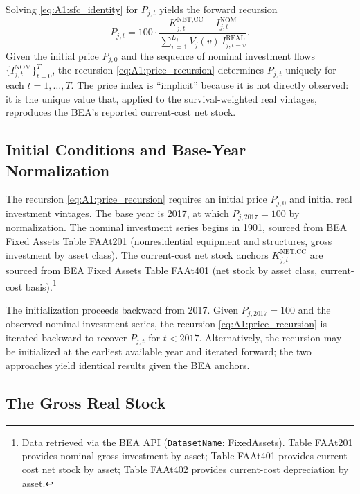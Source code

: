 Solving \eqref{eq:A1:sfc_identity} for $P_{j,t}$ yields the
forward recursion
\begin{equation}
	P_{j,t} = 100 \cdot
	\frac{K^{\text{NET,CC}}_{j,t} - I^{\text{NOM}}_{j,t}}
	{\displaystyle\sum_{v=1}^{L_j} V_j(v)\,
		I^{\text{REAL}}_{j,t-v}}.
	\label{eq:A1:price_recursion}
\end{equation}
Given the initial price $P_{j,0}$ and the sequence of nominal
investment flows $\{I^{\text{NOM}}_{j,t}\}_{t=0}^{T}$, the
recursion \eqref{eq:A1:price_recursion} determines $P_{j,t}$
uniquely for each $t = 1, \ldots, T$. The price index is
``implicit'' because it is not directly observed: it is the unique
value that, applied to the survival-weighted real vintages,
reproduces the BEA's reported current-cost net stock.

\subsection{Initial Conditions and Base-Year Normalization}
\label{app:A1:initialization}

The recursion \eqref{eq:A1:price_recursion} requires an initial
price $P_{j,0}$ and initial real investment vintages. The base
year is 2017, at which $P_{j,2017} = 100$ by normalization. The
nominal investment series begins in 1901, sourced from BEA Fixed
Assets Table FAAt201 (nonresidential equipment and structures,
gross investment by asset class). The current-cost net stock
anchors $K^{\text{NET,CC}}_{j,t}$ are sourced from BEA Fixed
Assets Table FAAt401 (net stock by asset class, current-cost
basis).\footnote{Data retrieved via the BEA API
	(\texttt{DatasetName}: FixedAssets). Table FAAt201 provides
	nominal gross investment by asset; Table FAAt401 provides
	current-cost net stock by asset; Table FAAt402 provides
	current-cost depreciation by asset.}

The initialization proceeds backward from 2017. Given
$P_{j,2017} = 100$ and the observed nominal investment series,
the recursion \eqref{eq:A1:price_recursion} is iterated backward
to recover $P_{j,t}$ for $t < 2017$. Alternatively, the recursion
may be initialized at the earliest available year and iterated
forward; the two approaches yield identical results given the
BEA anchors.

\subsection{The Gross Real Stock}
\label{app:A1:gross_stock}

